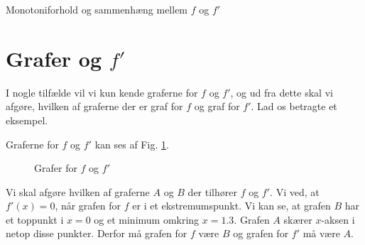 \begin{center}
\Huge
Monotoniforhold og sammenhæng mellem $f$ og $f'$
\end{center}
\section*{Grafer og $f'$}

I nogle tilfælde vil vi kun kende graferne for $f$ og $f'$, og ud fra dette skal vi afgøre, hvilken af graferne der er graf for $f$ og graf for $f'$. Lad os betragte et eksempel.
\begin{exa}
	Graferne for $f$ og $f'$ kan ses af Fig. \ref{fig:grafer}.
	\begin{figure}[H]
		\centering
		\caption{Grafer for $f$ og $f'$}
		\label{fig:grafer}
	\end{figure}
	Vi skal afgøre hvilken af graferne $A$ og $B$ der tilhører $f$ og $f'$. Vi ved, at $f'(x) = 0$, når grafen for $f$ er i et ekstremumspunkt. Vi kan se, at grafen $B$ har et toppunkt i $x=0$ og et 
	minimum omkring $x=1.3$. Grafen $A$ skærer $x$-aksen i netop disse punkter. Derfor må grafen for $f$ være $B$ og grafen for $f'$ må være $A$. 
\end{exa}

